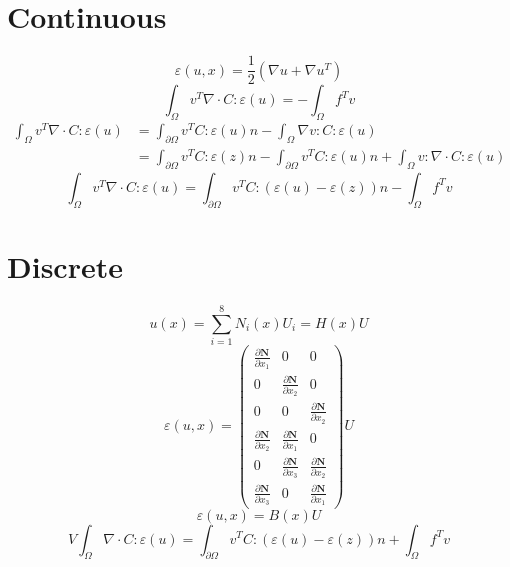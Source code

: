 \documentclass{article}
\begin{document}
\section{Continuous}
	\[\varepsilon(u,x) = \frac{1}{2}(\nabla u + \nabla u^T)\]
	\[\int_{\Omega} v^T\nabla\cdot C:\varepsilon(u) = -\int_{\Omega}f^Tv\]
	\begin{align}
	\int_{\Omega} v^T\nabla\cdot C:\varepsilon(u) &= \int_{\partial \Omega} v^TC:\varepsilon(u)n- \int_{\Omega} \nabla v:C:\varepsilon(u) \\
	&= \int_{\partial \Omega} v^TC:\varepsilon(z)n - \int_{\partial \Omega} v^TC:\varepsilon(u)n + \int_{\Omega} v:\nabla\cdot C:\varepsilon(u)
	\end{align}
	\[\int_{\Omega} v^T\nabla\cdot C:\varepsilon(u) =  \int_{\partial \Omega} v^TC:(\varepsilon(u)-\varepsilon(z))n - \int_{\Omega}f^Tv\]
	
\section{Discrete}
	\[u(x)=\sum_{i=1}^{8}N_i(x)U_i = H(x)U\]
	\[\varepsilon(u,x) = \begin{pmatrix}
	  \frac{\partial \mathbf{N}}{\partial x_1} & 0 & 0\\
	  0 & \frac{\partial \mathbf{N}}{\partial x_2} & 0\\
	  0 & 0 & \frac{\partial \mathbf{N}}{\partial x_2}\\
 	  \frac{\partial \mathbf{N}}{\partial x_2} & \frac{\partial \mathbf{N}}{\partial x_1} & 0\\
  	  0 & \frac{\partial \mathbf{N}}{\partial x_3} & \frac{\partial \mathbf{N}}{\partial x_2}\\
  	  \frac{\partial \mathbf{N}}{\partial x_3} & 0 & \frac{\partial \mathbf{N}}{\partial x_1}
	\end{pmatrix}U\]
	\[\varepsilon(u,x) = B(x)U\]
	\[V\int_{\Omega} \nabla\cdot C:\varepsilon(u) =  \int_{\partial \Omega} v^TC:(\varepsilon(u)-\varepsilon(z))n + \int_{\Omega}f^Tv\]
	
\end{document}
